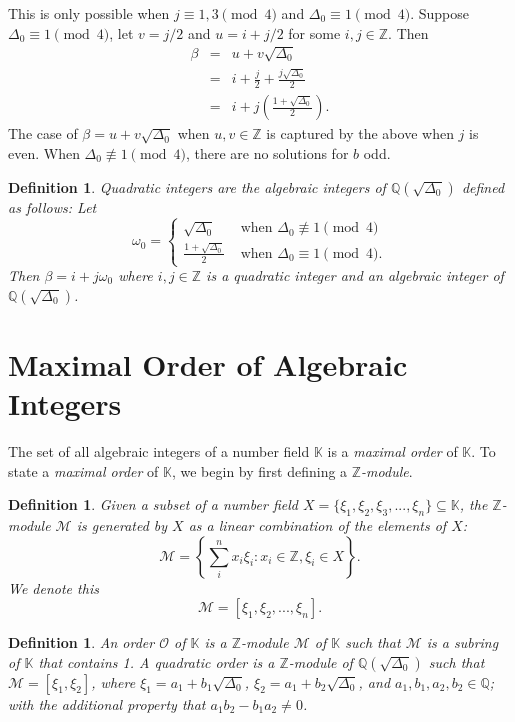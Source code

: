\documentclass{ucalgthes1}
\newtheorem{defn}[thm]{Definition}
\newcommand{\KK}{\mathbb{K}}
\newcommand{\MM}{\mathcal{M}}
\newcommand{\OO}{\mathcal{O}}
\newcommand{\ZZ}{\mathbb{Z}}
\newcommand{\QQ}{\mathbb{Q}}
\begin{document}
\noindent
This is only possible when $j \equiv 1,3 \pmod 4$ and $\Delta_0 \equiv 1 \pmod 4$.  Suppose $\Delta_0 \equiv 1 \pmod 4$, let $v = j/2$ and $u = i + j/2$ for some $i, j \in \ZZ$.  Then
\begin{eqnarray*}
	\beta & = & u + v \sqrt{\Delta_0} \\
	& = & i + \frac{j}{2} + \frac{j \sqrt{\Delta_0}}{2} \\
	& = & i + j \left( \frac{1 + \sqrt{\Delta_0}}{2} \right).
\end{eqnarray*}
The case of $\beta = u + v \sqrt{\Delta_0}$ when $u,v \in \ZZ$ is captured by the above when $j$ is even. When $\Delta_0 \not \equiv 1 \pmod 4$, there are no solutions for $b$ odd.

\begin{defn}
\emph{Quadratic integers} are the algebraic integers of $\QQ(\sqrt{\Delta_0})$ defined as follows: Let
\[
	\omega_0 = \begin{cases}
		\sqrt{\Delta_0} & \textrm{ when } \Delta_0 \not \equiv 1 \pmod 4 \\
		\frac{1+\sqrt{\Delta_0}}{2} & \textrm{ when } \Delta_0 \equiv 1 \pmod 4.
	\end{cases}
\]
Then $\beta = i + j \omega_0$ where $i,j \in \ZZ$ is a quadratic integer and an algebraic integer of $\QQ(\sqrt{\Delta_0})$.
\end{defn}


\bigbreak
\section{Maximal Order of Algebraic Integers}
The set of all algebraic integers of a number field $\KK$ is a \emph{maximal order} of $\KK$.  To state a \emph{maximal order} of $\KK$, we begin by first defining a \emph{$\ZZ$-module}.  

\begin{defn}
Given a subset of a number field $X = \{ \xi_1, \xi_2, \xi_3, ..., \xi_n \} \subseteq \KK$, the \emph{$\ZZ$-module} $\MM$ is generated by $X$ as a linear combination of the elements of $X$:
\[
	\MM = \left \{ \sum_{i}^n x_i \xi_i : x_i \in \ZZ, \xi_i \in X \right \}.
\]
We denote this
\[
	\MM = [ \xi_1, \xi_2, ..., \xi_n ].
\]
\end{defn}

\begin{defn}
An \emph{order} $\OO$ of $\KK$ is a $\ZZ$-module $\MM$ of $\KK$ such that $\MM$ is a subring of $\KK$ that contains 1.  A \emph{quadratic order} is a $\ZZ$-module of $\QQ(\sqrt{\Delta_0})$ such that $\MM = [\xi_1, \xi_2]$, where $\xi_1 = a_1 + b_1 \sqrt{\Delta_0}$, $\xi_2 = a_1 + b_2 \sqrt{\Delta_0}$, and $a_1, b_1, a_2, b_2 \in \QQ$; with the additional property that $a_1b_2-b_1a_2 \ne 0$.
\end{defn}
\end{document}
